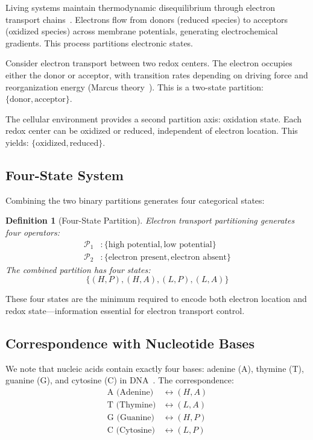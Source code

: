 \documentclass[twocolumn,aps,prb,superscriptaddress,longbibliography,floatfix]{revtex4-2}
\newtheorem{definition}[theorem]{Definition}
\theoremstyle{remark}
\begin{document}
Living systems maintain thermodynamic disequilibrium through electron
transport chains~\cite{Nicholls2013,Mitchell1961}. Electrons flow from
donors (reduced species) to acceptors (oxidized species) across membrane
potentials, generating electrochemical gradients. This process partitions
electronic states.

Consider electron transport between two redox centers. The electron
occupies either the donor or acceptor, with transition rates depending on
driving force and reorganization energy (Marcus theory~\cite{Marcus1956}).
This is a two-state partition: $\{\text{donor}, \text{acceptor}\}$.

The cellular environment provides a second partition axis: oxidation
state. Each redox center can be oxidized or reduced, independent of
electron location. This yields: $\{\text{oxidized}, \text{reduced}\}$.

\subsection{Four-State System}

Combining the two binary partitions generates four categorical states:

\begin{definition}[Four-State Partition]
\label{def:fourstate}
Electron transport partitioning generates four operators:
\begin{align}
\mathcal{P}_1 &: \{\text{high potential}, \text{low potential}\} \\
\mathcal{P}_2 &: \{\text{electron present}, \text{electron absent}\}
\end{align}
The combined partition has four states:
\begin{equation}
\{(H,P), (H,A), (L,P), (L,A)\}
\end{equation}
\end{definition}

These four states are the minimum required to encode both electron
location and redox state---information essential for electron transport
control.

\subsection{Correspondence with Nucleotide Bases}

We note that nucleic acids contain exactly four bases: adenine (A),
thymine (T), guanine (G), and cytosine (C) in DNA~\cite{Watson1953}. The
correspondence:
\begin{align}
\text{A (Adenine)} &\leftrightarrow (H, A) \\
\text{T (Thymine)} &\leftrightarrow (L, A) \\
\text{G (Guanine)} &\leftrightarrow (H, P) \\
\text{C (Cytosine)} &\leftrightarrow (L, P)
\end{align}
\end{document}
